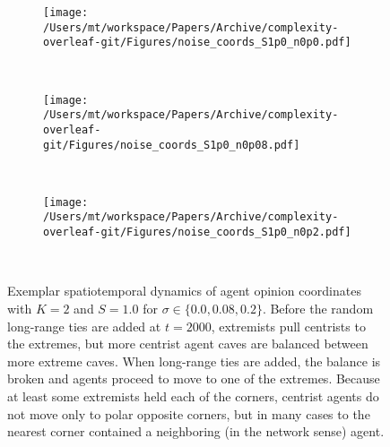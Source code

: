 \begin{figure}[H]
  \centering
    \begin{subfigure}[t]{\textwidth}
      \centering
      \texttt{[image: /Users/mt/workspace/Papers/Archive/complexity-overleaf-git/Figures/noise\_coords\_S1p0\_n0p0.pdf]}
    \end{subfigure} \\
    \begin{subfigure}[t]{\textwidth}
      \centering
      \texttt{[image: /Users/mt/workspace/Papers/Archive/complexity-overleaf-git/Figures/noise\_coords\_S1p0\_n0p08.pdf]}
    \end{subfigure} \\
    \begin{subfigure}[t]{\textwidth}
      \centering
      \texttt{[image: /Users/mt/workspace/Papers/Archive/complexity-overleaf-git/Figures/noise\_coords\_S1p0\_n0p2.pdf]}
    \end{subfigure} \\
  \caption{Exemplar spatiotemporal dynamics of agent opinion coordinates with $K=2$ and
    $S=1.0$ for $\sigma \in \{0.0,0.08,0.2\}$.  Before the random long-range ties are added at 
    $t=2000$, extremists pull centrists to the extremes, but more centrist
    agent caves are balanced between more extreme caves. When long-range ties
    are added, the balance is broken and agents proceed to move to one of the
    extremes. Because at least some extremists held each of the corners, 
    centrist agents do not move only to polar opposite corners, but in many 
    cases to the nearest corner contained a neighboring (in the network sense) agent. 
  }
  \label{fig:noiseCoordsS1p0}
\end{figure}



